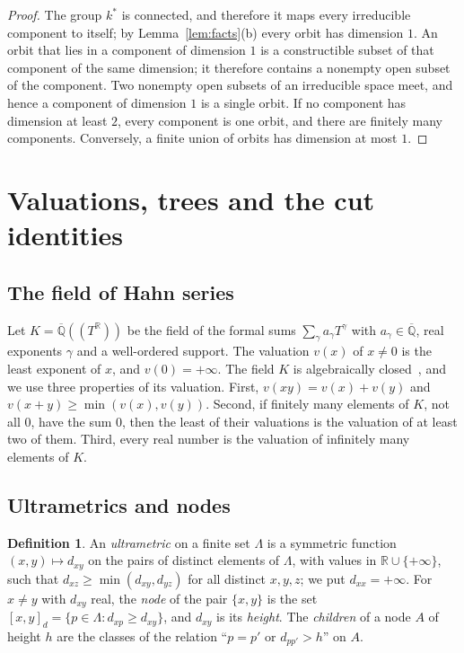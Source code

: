 \documentclass[11pt]{amsart}
\theoremstyle{definition}
\newtheorem{definition}[theorem]{Definition}
\theoremstyle{remark}
\numberwithin{equation}{section}
\newcommand{\Qbar}{\overline{\mathbb{Q}}}
\newcommand{\RR}{\mathbb{R}}
\newcommand{\nd}[2]{[#1]_{#2}}
\begin{document}
\begin{proof}
The group $k^{*}$ is connected, and therefore it maps every irreducible component to itself; by
Lemma~\ref{lem:facts}(b) every orbit has dimension $1$. An orbit that lies in a component of dimension
$1$ is a constructible subset of that component of the same dimension; it therefore contains a nonempty
open subset of the component. Two nonempty open subsets of an irreducible space meet, and hence a
component of dimension $1$ is a single orbit. If no component has dimension at least $2$, every
component is one orbit, and there are finitely many components. Conversely, a finite union of orbits has
dimension at most $1$.
\end{proof}

\section{Valuations, trees and the cut identities}\label{sec:val}

\subsection{The field of Hahn series} Let $K = \Qbar((T^{\RR}))$ be the field of the formal sums
$\sum_{\gamma} a_\gamma T^{\gamma}$ with $a_\gamma \in \Qbar$, real exponents $\gamma$ and a well-ordered
support. The valuation $v(x)$ of $x \ne 0$ is the least exponent of $x$, and $v(0) = +\infty$. The field
$K$ is algebraically closed~\cite[Theorem~1 and Corollary~4]{poonen1993}, and we use three properties
of its valuation. First, $v(xy) = v(x) + v(y)$ and $v(x + y) \ge \min(v(x), v(y))$. Second, if finitely many elements
of $K$, not all $0$, have the sum $0$, then the least of their valuations is the valuation of at least
two of them. Third, every real number is the valuation of infinitely many elements of $K$.

\subsection{Ultrametrics and nodes}

\begin{definition}\label{def:ultra}
An \emph{ultrametric} on a finite set $\Lambda$ is a symmetric function
$(x, y) \mapsto d_{xy}$ on the pairs of distinct elements of $\Lambda$, with values in
$\RR \cup \{+\infty\}$, such that $d_{xz} \ge \min(d_{xy}, d_{yz})$ for all distinct $x, y, z$; we put
$d_{xx} = +\infty$. For $x \ne y$ with $d_{xy}$ real, the \emph{node} of the pair $\{x, y\}$ is the set
$\nd{x, y}{d} = \{ p \in \Lambda : d_{xp} \ge d_{xy} \}$, and $d_{xy}$ is its \emph{height}. The
\emph{children} of a node $A$ of height $h$ are the classes of the relation ``$p = p'$ or $d_{pp'} > h$''
on $A$.
\end{definition}
\end{document}
